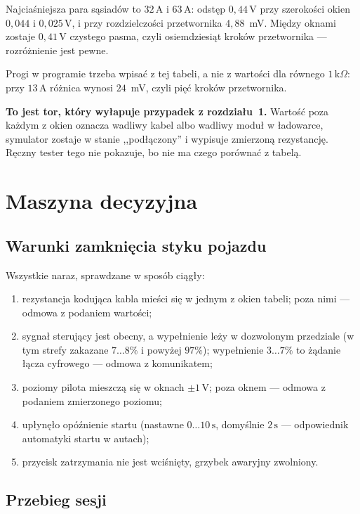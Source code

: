 \documentclass[a4paper,11pt]{article}
\newcommand{\kohm}{\,\mathrm{k}\Omega}
\newcommand{\volt}{\,\mathrm{V}}
\newcommand{\amp}{\,\mathrm{A}}
\newcommand{\sek}{\,\mathrm{s}}
\begin{document}
Najciaśniejsza para sąsiadów to $32\amp$ i $63\amp$: odstęp $0{,}44\volt$ przy
szerokości okien $0{,}044$ i $0{,}025\volt$, i przy rozdzielczości przetwornika
$4{,}88$~mV. Między oknami zostaje $0{,}41\volt$ czystego pasma, czyli
osiemdziesiąt kroków przetwornika --- rozróżnienie jest pewne.

Progi w programie trzeba wpisać z tej tabeli, a nie z wartości dla równego
$1\kohm$: przy $13\amp$ różnica wynosi $24$~mV, czyli pięć kroków przetwornika.

\textbf{To jest tor, który wyłapuje przypadek z rozdziału~1.} Wartość poza każdym
z okien oznacza wadliwy kabel albo wadliwy moduł w ładowarce, symulator zostaje
w stanie ,,podłączony'' i wypisuje zmierzoną rezystancję. Ręczny tester tego nie
pokazuje, bo nie ma czego porównać z tabelą.

\section{Maszyna decyzyjna}
\label{sec:maszyna}

\subsection{Warunki zamknięcia styku pojazdu}

Wszystkie naraz, sprawdzane w sposób ciągły:

\begin{enumerate}
\item rezystancja kodująca kabla mieści się w jednym z okien tabeli; poza nimi ---
      odmowa z podaniem wartości;
\item sygnał sterujący jest obecny, a wypełnienie leży w dozwolonym przedziale
      (w tym strefy zakazane $7\ldots8\%$ i powyżej $97\%$); wypełnienie
      $3\ldots7\%$ to żądanie łącza cyfrowego --- odmowa z komunikatem;
\item poziomy pilota mieszczą się w oknach $\pm1\volt$; poza oknem --- odmowa
      z podaniem zmierzonego poziomu;
\item upłynęło opóźnienie startu (nastawne $0\ldots10\sek$, domyślnie $2\sek$ ---
      odpowiednik automatyki startu w autach);
\item przycisk zatrzymania nie jest wciśnięty, grzybek awaryjny zwolniony.
\end{enumerate}

\subsection{Przebieg sesji}
\end{document}
